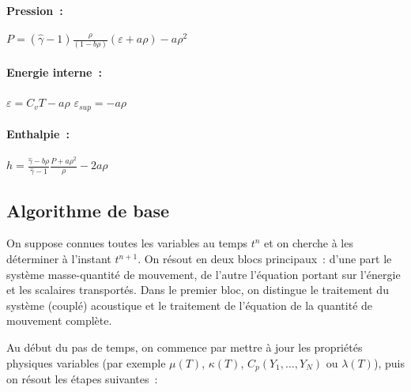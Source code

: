 \paragraph{Pression~:}

$P = (\hat{\gamma} -1) \displaystyle\frac{\rho}{(1-b\rho)}
(\varepsilon + a\rho) - a \rho^2$

\paragraph{Energie interne~:}

$\varepsilon = C_v T - a \rho$\qquad{}
$\varepsilon_{sup} = - a \rho$


\paragraph{Enthalpie~:}

$h = \displaystyle\frac{\hat{\gamma}-b\rho}{\hat{\gamma}-1}
 \displaystyle\frac{P+a\rho^2}{\rho} - 2a\rho$


\subsection*{Algorithme de base}

On suppose connues toutes les variables au temps $t^n$ et on cherche
\`a les d\'eterminer \`a l'instant $t^{n+1}$.
On r\'esout en deux blocs principaux~: d'une part le syst\`eme masse-quantit\'e
de mouvement, de l'autre l'\'equation portant sur l'\'energie et les scalaires
transport\'es.
Dans le premier bloc, on distingue le traitement du syst\`eme (coupl\'e)
acoustique et le traitement de l'\'equation de la quantit\'e de mouvement
compl\`ete.

Au d\'ebut du pas de temps, on commence par mettre \`a jour
les propri\'et\'es physiques variables (par exemple $\mu(T)$, $\kappa(T)$,
$C_p(Y_1,\ldots ,Y_N)$ ou $\lambda(T)$), puis on
r\'esout les \'etapes suivantes~:

